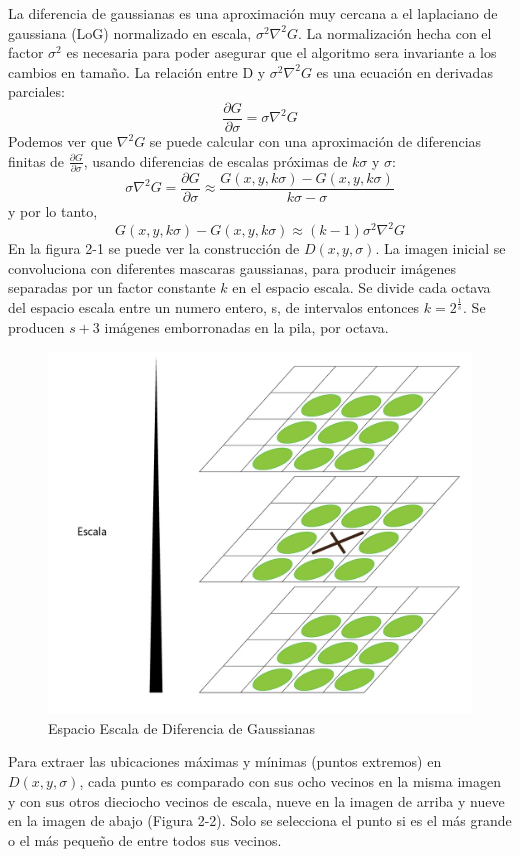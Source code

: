 		La diferencia de gaussianas es una aproximación muy cercana a el laplaciano de gaussiana (LoG) normalizado en escala, $\sigma^2 \nabla^2 G$. La normalización hecha con el factor $\sigma^2$ es necesaria para poder asegurar que el algoritmo sera invariante a los cambios en tamaño. La relación entre D y $\sigma^2 \nabla^2 G$ es una ecuación en derivadas parciales:
		$$\frac{\partial G}{\partial \sigma} = \sigma \nabla^2 G$$
		Podemos ver que $\nabla^2 G$ se puede calcular con una aproximación de diferencias finitas de  $\frac{\partial G}{\partial \sigma}$, usando diferencias de escalas próximas de $k\sigma$ y $\sigma$:
		$$ \sigma \nabla^2 G = \frac{ \partial G}{\partial \sigma} \approx  \frac{G(x , y , k \sigma) - G( x , y, k \sigma)}{k \sigma - \sigma}$$
		y por lo tanto,
		$$ G(x , y , k \sigma) - G( x , y, k \sigma) \approx (k - 1)\sigma^2 \nabla^2 G $$
		En la figura 2-1 se puede ver la construcción de $D(x,y,\sigma)$. La imagen inicial se convoluciona con diferentes mascaras gaussianas, para producir imágenes separadas por un factor constante $k$ en el espacio escala. Se divide cada octava del espacio escala entre un numero entero, s, de intervalos entonces $k= 2^\frac{1}{s}$. Se producen $s+3$  imágenes emborronadas en la pila, por octava.
		\begin{figure}[h]
			\centering
				\includegraphics[scale=0.15]{img/EscalaPuntosExtremos.jpg}
			\caption{Espacio Escala de Diferencia de Gaussianas}
		\end{figure}
		Para extraer las ubicaciones máximas y mínimas (puntos extremos) en $D(x,y,\sigma)$, cada punto es comparado con sus ocho vecinos en la misma imagen y con sus otros dieciocho vecinos de escala, nueve en la imagen de arriba y nueve en la imagen de abajo (Figura 2-2). Solo se selecciona el punto si es el más grande o el más pequeño de entre todos sus vecinos.
	
